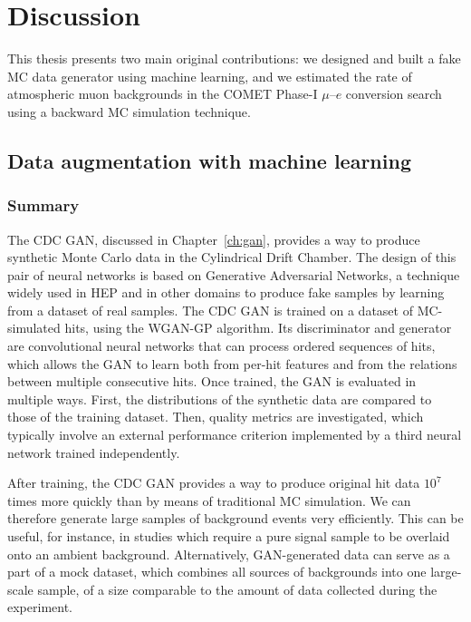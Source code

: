 \chapter{Discussion}

This thesis presents two main original contributions: we designed and built a
fake MC data generator using machine learning, and we estimated the rate of
atmospheric muon backgrounds in the COMET Phase-I $\mu$--$e$ conversion search
using a backward MC simulation technique.

\section{Data augmentation with machine learning}
\subsection{Summary}
The CDC GAN, discussed in Chapter~\ref{ch:gan}, provides a way to produce
synthetic Monte Carlo data in the Cylindrical Drift Chamber. The design of this
pair of neural networks is based on Generative Adversarial Networks, a technique
widely used in HEP and in other domains to produce fake samples by learning from
a dataset of real samples. The CDC GAN is trained on a dataset of MC-simulated
hits, using the WGAN-GP algorithm. Its discriminator and generator are
convolutional neural networks that can process ordered sequences of hits, which
allows the GAN to learn both from per-hit features and from the relations
between multiple consecutive hits. 
Once trained, the GAN is evaluated in multiple ways. First, the distributions of
the synthetic data are compared to those of the training dataset. Then, quality
metrics are investigated, which typically involve an external performance criterion
implemented by a third neural network trained independently.

After training, the CDC GAN provides a way to produce original hit data $10^7$
times more quickly than by means of traditional MC simulation. We can therefore
generate large samples of background events very efficiently. This can be
useful, for instance, in studies which require a pure signal sample to be
overlaid onto an ambient background. Alternatively, GAN-generated data can serve
as a part of a mock dataset, which combines all sources of backgrounds into one
large-scale sample, of a size comparable to the amount of data collected during
the experiment.


